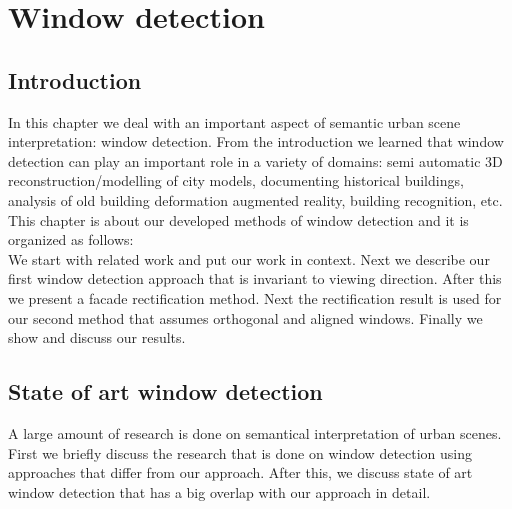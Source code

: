 
\section{Window detection}
\label{sec:windowDetection}
\subsection{Introduction}
In this chapter we deal with an important aspect of semantic urban scene interpretation: window detection. 
From the introduction we learned that window detection can play an important role in
a variety of domains: semi automatic 3D reconstruction/modelling of city models, documenting
historical buildings, analysis of old building deformation augmented
reality, building recognition, etc.\\

This chapter is about our developed methods of window detection and it is organized
as follows:\\
  We start with related work and put our work in context.  Next we describe our first
  window detection approach that is invariant to viewing direction.  After this
  we present a facade rectification method. Next the rectification result is used for our
  second method that assumes orthogonal and aligned windows.  Finally we show
  and discuss our results. 

\subsection{State of art window detection} %
A large amount of research is done on semantical interpretation of urban scenes. 
First we briefly discuss the research that is done on window detection using
approaches that differ from our approach.  After this, we discuss state of art
window detection that has a big overlap with our approach in detail.\\

